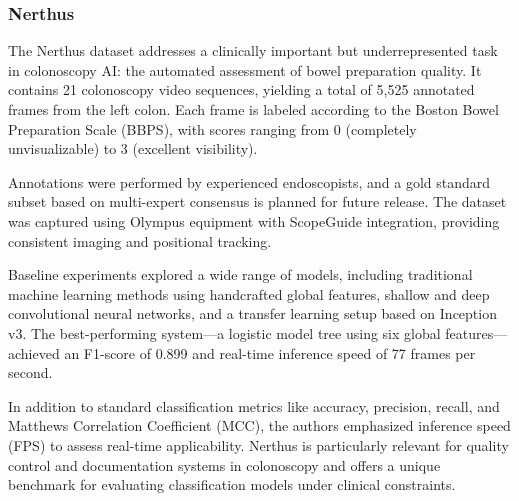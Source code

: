 \subsubsection*{Nerthus}

The Nerthus dataset addresses a clinically important but underrepresented task in colonoscopy AI: the automated assessment of bowel preparation quality. It contains 21 colonoscopy video sequences, yielding a total of 5{,}525 annotated frames from the left colon. Each frame is labeled according to the Boston Bowel Preparation Scale (BBPS), with scores ranging from 0 (completely unvisualizable) to 3 (excellent visibility).

Annotations were performed by experienced endoscopists, and a gold standard subset based on multi-expert consensus is planned for future release. The dataset was captured using Olympus equipment with ScopeGuide integration, providing consistent imaging and positional tracking.

Baseline experiments explored a wide range of models, including traditional machine learning methods using handcrafted global features, shallow and deep convolutional neural networks, and a transfer learning setup based on Inception v3. The best-performing system—a logistic model tree using six global features—achieved an F1-score of 0.899 and real-time inference speed of 77 frames per second.

In addition to standard classification metrics like accuracy, precision, recall, and Matthews Correlation Coefficient (MCC), the authors emphasized inference speed (FPS) to assess real-time applicability. Nerthus is particularly relevant for quality control and documentation systems in colonoscopy and offers a unique benchmark for evaluating classification models under clinical constraints.
